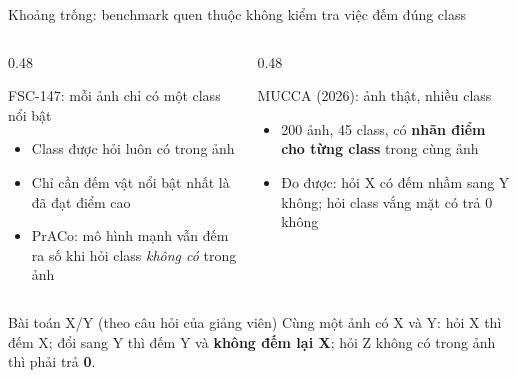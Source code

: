\documentclass[aspectratio=169,10pt]{beamer}
\gdef\currentsource{}
\newcommand{\source}[1]{\gdef\currentsource{#1}}
\begin{document}
\begin{frame}{Khoảng trống: benchmark quen thuộc không kiểm tra việc đếm đúng class}
\source{Ciampi và cs., WACV 2025 (PrACo); Pacini và cs., 2026 (MUCCA)}
\begin{columns}[T]
\begin{column}{0.48\textwidth}
\begin{alertblock}{FSC-147: mỗi ảnh chỉ có một class nổi bật}
\begin{itemize}\small
\item Class được hỏi luôn có trong ảnh
\item Chỉ cần đếm vật nổi bật nhất là đã đạt điểm cao
\item PrACo: mô hình mạnh vẫn đếm ra số khi hỏi class \emph{không có} trong ảnh
\end{itemize}
\end{alertblock}
\end{column}
\begin{column}{0.48\textwidth}
\begin{exampleblock}{MUCCA (2026): ảnh thật, nhiều class}
\begin{itemize}\small
\item 200 ảnh, 45 class, có \textbf{nhãn điểm cho từng class} trong cùng ảnh
\item Đo được: hỏi X có đếm nhầm sang Y không; hỏi class vắng mặt có trả 0 không
\end{itemize}
\end{exampleblock}
\end{column}
\end{columns}
\vspace{2mm}
\begin{block}{Bài toán X/Y (theo câu hỏi của giảng viên)}
\small Cùng một ảnh có X và Y: hỏi X thì đếm X; đổi sang Y thì đếm Y và \textbf{không đếm lại X}; hỏi Z không có trong ảnh thì phải trả \textbf{0}.
\end{block}
\end{frame}
\end{document}
